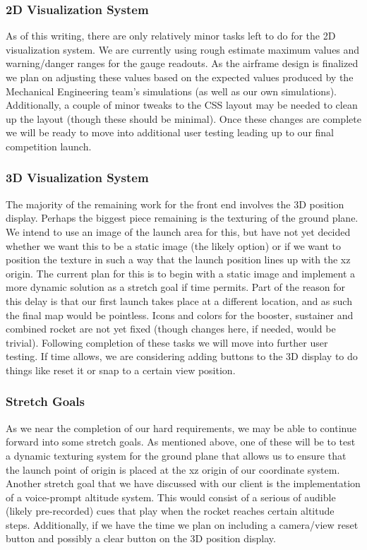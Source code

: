 \documentclass[journal,10pt,onecolumn,compsoc]{IEEEtran}
\begin{document}
		\subsubsection{2D Visualization System}
			As of this writing, there are only relatively minor tasks left to do for the 2D visualization system. 
			We are currently using rough estimate maximum values and warning/danger ranges for the gauge readouts. 
			As the airframe design is finalized we plan on adjusting these values based on the expected values produced by the Mechanical Engineering team's simulations (as well as our own simulations).
			Additionally, a couple of minor tweaks to the CSS layout may be needed to clean up the layout (though these should be minimal).
			Once these changes are complete we will be ready to move into additional user testing leading up to our final competition launch.
		
    \subsubsection{3D Visualization System}
			The majority of the remaining work for the front end involves the 3D position display.
			Perhaps the biggest piece remaining is the texturing of the ground plane.
			We intend to use an image of the launch area for this, but have not yet decided whether we want this to be a static image (the likely option) or if we want to position the texture in such a way that the launch position lines up with the xz origin.
			The current plan for this is to begin with a static image and implement a more dynamic solution as a stretch goal if time permits.
			Part of the reason for this delay is that our first launch takes place at a different location, and as such the final map would be pointless.
      Icons and colors for the booster, sustainer and combined rocket are not yet fixed (though changes here, if needed, would be trivial).
			Following completion of these tasks we will move into further user testing.
			If time allows, we are considering adding buttons to the 3D display to do things like reset it or snap to a certain view position.
		
    \subsubsection{Stretch Goals}
			As we near the completion of our hard requirements, we may be able to continue forward into some stretch goals.
			As mentioned above, one of these will be to test a dynamic texturing system for the ground plane that allows us to ensure that the launch point of origin is placed at the xz origin of our coordinate system.
			Another stretch goal that we have discussed with our client is the implementation of a voice-prompt altitude system.
			This would consist of a serious of audible (likely pre-recorded) cues that play when the rocket reaches certain altitude steps.
			Additionally, if we have the time we plan on including a camera/view reset button and possibly a clear button on the 3D position display.
\newpage
\end{document}
